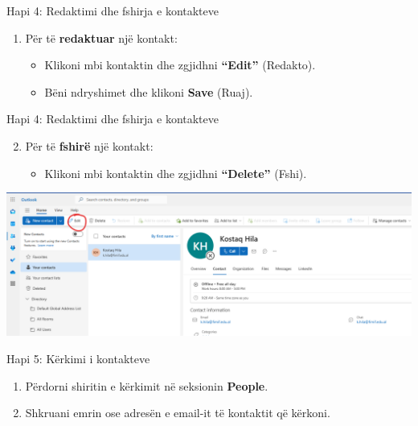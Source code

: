 \documentclass[
  ignorenonframetext,
]{beamer}
\providecommand{\tightlist}{%
  \setlength{\itemsep}{0pt}\setlength{\parskip}{0pt}}
\begin{document}
\begin{frame}{Hapi 4: Redaktimi dhe fshirja e kontakteve}
\label{hapi-4-redaktimi-dhe-fshirja-e-kontakteve}
\begin{enumerate}
\item
  Për të \textbf{redaktuar} një kontakt:

  \begin{itemize}
  \item
    Klikoni mbi kontaktin dhe zgjidhni \textbf{``Edit''} (Redakto).
  \item
    Bëni ndryshimet dhe klikoni \textbf{Save} (Ruaj).
  \end{itemize}
\end{enumerate}
\end{frame}

\begin{frame}{Hapi 4: Redaktimi dhe fshirja e kontakteve}
\label{hapi-4-redaktimi-dhe-fshirja-e-kontakteve-1}
\begin{enumerate}
\setcounter{enumi}{1}
\item
  Për të \textbf{fshirë} një kontakt:

  \begin{itemize}
  \tightlist
  \item
    Klikoni mbi kontaktin dhe zgjidhni \textbf{``Delete''} (Fshi).
  \end{itemize}
\end{enumerate}

\includegraphics{./images/outlook25.png}
\end{frame}

\begin{frame}{Hapi 5: Kërkimi i kontakteve}
\label{hapi-5-kuxebrkimi-i-kontakteve}
\begin{enumerate}
\item
  Përdorni shiritin e kërkimit në seksionin \textbf{People}.
\item
  Shkruani emrin ose adresën e email-it të kontaktit që kërkoni.
\end{enumerate}
\end{frame}
\end{document}

